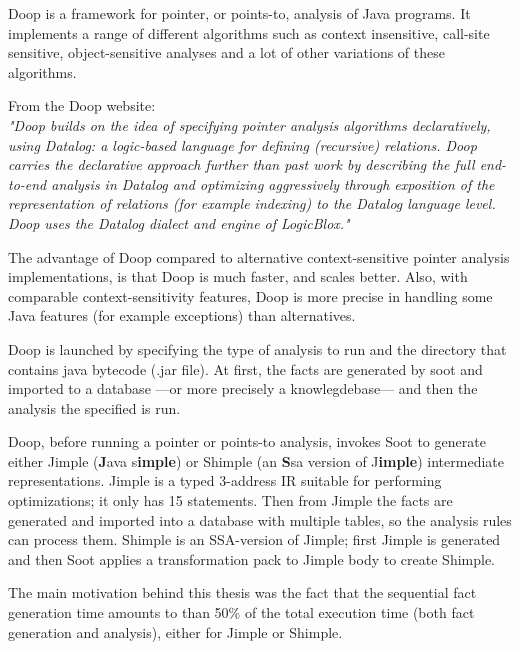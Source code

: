 \documentclass{dithesis}
\begin{document}
    Doop is a framework for pointer, or points-to, analysis of Java programs. It implements a range of different algorithms such as context insensitive, call-site sensitive, object-sensitive analyses and a lot of other variations of these algorithms.

	From the Doop website: \\
    \textit{"Doop builds on the idea of specifying pointer analysis algorithms declaratively, using Datalog: a logic-based language for defining (recursive) relations. Doop carries the declarative approach further than past work by describing the full end-to-end analysis in Datalog and optimizing aggressively through exposition of the representation of relations (for example indexing) to the Datalog language level. Doop uses the Datalog dialect and engine of LogicBlox."}

    The advantage of Doop compared to alternative context-sensitive pointer analysis implementations, is that Doop is much faster, and scales better. Also, with comparable context-sensitivity features, Doop is more precise in handling some Java features (for example exceptions) than alternatives.

    Doop is launched by specifying the type of analysis to run and the directory that contains java bytecode (.jar file). At first, the facts are generated by soot and imported to a database ---or more precisely a knowlegdebase--- and then the analysis the specified is run. \cite{Doop: Framework for Java Pointer Analysis}

        Doop, before running a pointer or points-to analysis, invokes Soot to generate either Jimple (\textbf{J}ava s\textbf{imple}) or Shimple (an \textbf{S}sa version of J\textbf{imple}) intermediate representations. Jimple is a typed 3-address IR suitable for performing optimizations; it only has 15 statements. Then from Jimple the facts are generated and imported into a database with multiple tables, so the analysis rules can process them. Shimple is an SSA-version of Jimple; first Jimple is generated and then Soot applies a transformation pack to Jimple body to create Shimple.

        The main motivation behind this thesis was the fact that the sequential fact generation time amounts to than 50\% of the total execution time (both fact generation and analysis), either for Jimple or Shimple.
\end{document}
